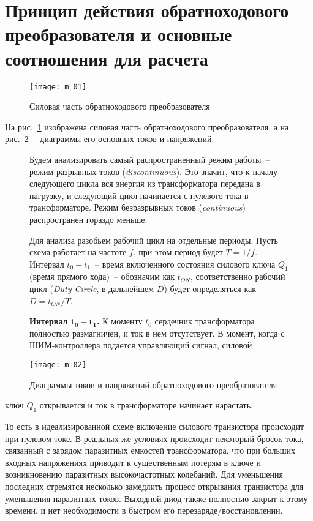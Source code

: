 \section{Принцип действия обратноходового преобразователя и основные
соотношения для расчета}
\begin{figure}[h!]
	\center
	\texttt{[image: m\_01]}
	\parbox{.6\textwidth}{\caption{Силовая часть обратноходового
	преобразователя}\label{p01}}
\end{figure}
На рис.~\ref{p01} изображена силовая часть обратноходового преобразователя, а на
рис.~\ref{p02}~-- диаграммы его основных токов и напряжений.
		
\begin{figure}[h!]
	\begin{minipage}{.5\textwidth}
		Будем анализировать самый распространенный режим работы~-- режим
		разрывных токов (\emph{discontinuous}). Это значит, что к началу
		следующего цикла вся энергия из трансформатора передана в нагрузку, и
		следующий цикл начинается с нулевого тока в трансформаторе. Режим
		безразрывных токов (\emph{continuous}) распространен гораздо меньше.
		
		Для анализа разобьем рабочий цикл на отдельные периоды. Пусть схема
		работает на частоте \( f \), при этом период будет \( T = 1/f \).
		Интервал \( t_0 - t_1 \)~-- время включенного состояния силового ключа
		\( Q_1 \) (время прямого хода)~-- обозначим как \( t_{ON} \),
		соответственно рабочий цикл (\emph{Duty Circle}, в дальнейшем \( D \))
		будет определяться как \( D = t_{ON}/T \).
			 
		\textbf{Интервал \( \bm{t_0 - t_1} \).} К моменту \( t_0 \) сердечник
		трансформатора полностью размагничен, и ток в нем отсутствует. В момент,
		когда с ШИМ-контроллера подается управляющий сигнал, силовой
	\end{minipage} \hfill
	\begin{minipage}{.45\textwidth}
		\texttt{[image: m\_02]}
		\parbox{\textwidth}{\caption{Диаграммы токов и напряжений
		обратноходового преобразователя}\label{p02}}
	\end{minipage}
\end{figure}
\noindent ключ \( Q_1 \) открывается и ток в трансформаторе начинает нарастать.

То есть в идеализированной схеме включение силового транзистора происходит при нулевом
токе. В реальных же условиях происходит некоторый бросок тока, связанный с
зарядом паразитных емкостей трансформатора, что при больших входных напряжениях
приводит к существенным потерям в ключе и возникновению паразитных
высокочастотных колебаний. Для уменьшения последних стремятся несколько
замедлить процесс открывания транзистора для уменьшения паразитных токов.
Выходной диод также полностью закрыт к этому времени, и нет необходимости в
быстром его перезаряде/восстановлении.

